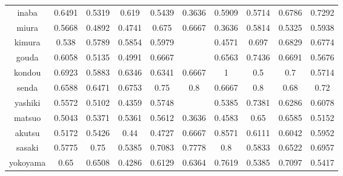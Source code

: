 \documentclass[11pt,a4paper,dvipdfmx]{jsarticle}
\begin{document}
\begin{tabular}{c||c|c|c|c|c|c|c|c|c}
    inaba & 0.6491 & 0.5319 & 0.619 & 0.5439 & 0.3636 & 0.5909 & 0.5714 & 0.6786 & 0.7292 \\
    miura & 0.5668 & 0.4892 & 0.4741 & 0.675 & 0.6667 & 0.3636 & 0.5814 & 0.5325 & 0.5938 \\
    kimura & 0.538 & 0.5789 & 0.5854 & 0.5979 &  & 0.4571 & 0.697 & 0.6829 & 0.6774 \\
    gouda & 0.6058 & 0.5135 & 0.4991 & 0.6667 &  & 0.6563 & 0.7436 & 0.6691 & 0.5676 \\
    kondou & 0.6923 & 0.5883 & 0.6346 & 0.6341 & 0.6667 & 1 & 0.5 & 0.7 & 0.5714 \\
    senda & 0.6588 & 0.6471 & 0.6753 & 0.75 & 0.8 & 0.6667 & 0.8 & 0.68 & 0.72 \\
    yashiki & 0.5572 & 0.5102 & 0.4359 & 0.5748 &  & 0.5385 & 0.7381 & 0.6286 & 0.6078 \\
    matsuo & 0.5043 & 0.5371 & 0.5361 & 0.5612 & 0.3636 & 0.4583 & 0.65 & 0.6585 & 0.5152 \\
    akutsu & 0.5172 & 0.5426 & 0.44 & 0.4727 & 0.6667 & 0.8571 & 0.6111 & 0.6042 & 0.5952 \\
    sasaki & 0.5775 & 0.75 & 0.5385 & 0.7083 & 0.7778 & 0.8 & 0.5833 & 0.6522 & 0.6957 \\
    yokoyama & 0.65 & 0.6508 & 0.4286 & 0.6129 & 0.6364 & 0.7619 & 0.5385 & 0.7097 & 0.5417 \\
    
    
\end{tabular}
\end{document}
